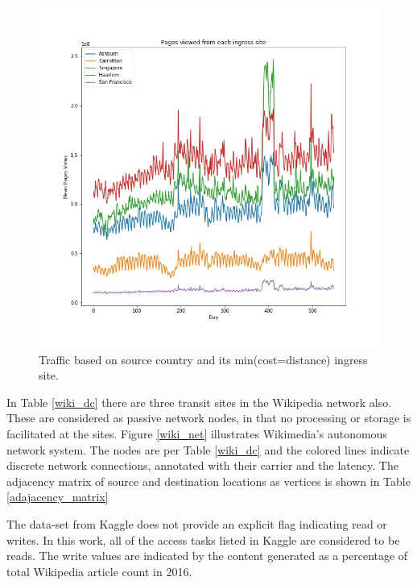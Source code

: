 \documentclass[conference]{IEEEtran}
\begin{document}
\begin{figure}[htbp]
\centering
\includegraphics[scale=.35] {ingress_hitrate.jpg}
\caption{Traffic based on source country and its min(cost=distance) ingress site.}
\label{ingress_hitrate}
\end{figure}

In Table \ref{wiki_dc} there are three transit sites in the Wikipedia network also. These are considered as passive network nodes, in that no processing or storage is facilitated at the sites. Figure \ref{wiki_net} illustrates Wikimedia's autonomous network system. The nodes are per Table \ref{wiki_dc} and the colored lines indicate discrete network connections, annotated with their carrier and the latency. The adjacency matrix of source and destination locations as vertices is shown in Table \ref{adajacency_matrix}

The data-set from Kaggle does not provide an explicit flag indicating read or writes. In this work, all of the access tasks listed in Kaggle are considered to be reads. The write values are indicated by the content generated as a percentage of total Wikipedia article count in 2016. 
\end{document}
